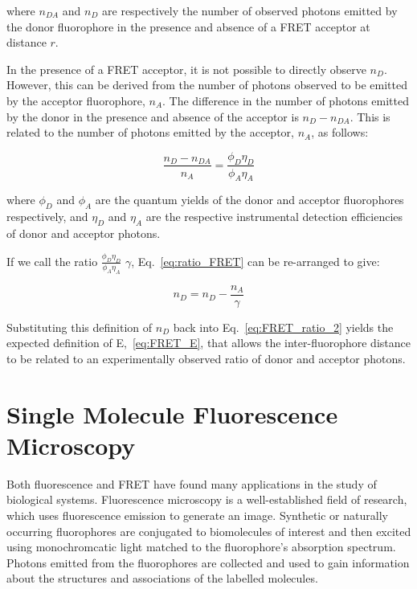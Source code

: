 where $n_{DA}$ and $n_D$ are respectively the number of observed photons emitted by the donor fluorophore in the presence and absence of a FRET acceptor at distance $r$.

In the presence of a FRET acceptor, it is not possible to directly observe $n_D$. However, this can be derived from the number of photons observed to be emitted by the acceptor fluorophore, $n_A$. The difference in the number of photons emitted by the donor in the presence and absence of the acceptor is $n_D - n_{DA}$. This is related to the number of photons emitted by the acceptor, $n_A$, as follows:

\begin{equation}
\frac{n_D - n_{DA}}{n_A} = \frac{\phi_D\eta_D}{\phi_A\eta_A}
\label{eq:ratio_FRET}
\end{equation}

where $\phi_D$ and $\phi_A$ are the quantum yields of the donor and acceptor fluorophores respectively, and $\eta_D$ and $\eta_A$ are the respective instrumental detection efficiencies of donor and acceptor photons.

If we call the ratio $\frac{\phi_D\eta_D}{\phi_A\eta_A}$ $\gamma$, Eq.~\ref{eq:ratio_FRET} can be re-arranged to give:

\begin{equation}
n_D = n_D - \frac{n_A}{\gamma}
\label{eq:get_gamma}
\end{equation}

Substituting this definition of $n_D$ back into Eq.~\ref{eq:FRET_ratio_2} yields the expected definition of E,~\ref{eq:FRET_E}, that allows the inter-fluorophore distance to be related to an experimentally observed ratio of donor and acceptor photons.

\section{Single Molecule Fluorescence Microscopy}
Both fluorescence and FRET have found many applications in the study of biological systems. Fluorescence microscopy is a well-established field of research, which uses fluorescence emission to generate an image. Synthetic or naturally occurring fluorophores are conjugated to biomolecules of interest and then excited using monochromcatic light matched to the fluorophore's absorption spectrum. Photons emitted from the fluorophores are collected and used to gain information about the structures and associations of the labelled molecules. 

